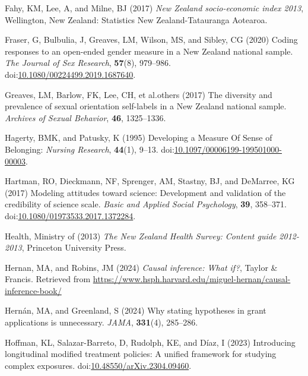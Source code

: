 \documentclass[
  single column]{article}
\newlength{\cslhangindent}
\newenvironment{CSLReferences}[2] %
 {\begin{list}{}{%
  \setlength{\itemindent}{0pt}
  \setlength{\leftmargin}{0pt}
  \setlength{\parsep}{0pt}
  \ifodd #1
   \setlength{\leftmargin}{\cslhangindent}
   \setlength{\itemindent}{-1\cslhangindent}
  \fi
  \setlength{\itemsep}{#2\baselineskip}}}
 {\end{list}}
\begin{document}
\begin{CSLReferences}{1}{0}
Fahy, KM, Lee, A, and Milne, BJ (2017) \emph{{N}ew {Z}ealand
socio-economic index 2013}, Wellington, New Zealand: Statistics New
Zealand-Tatauranga Aotearoa.

Fraser, G, Bulbulia, J, Greaves, LM, Wilson, MS, and Sibley, CG (2020)
Coding responses to an open-ended gender measure in a {N}ew {Z}ealand
national sample. \emph{The Journal of Sex Research}, \textbf{57}(8),
979--986.
doi:\href{https://doi.org/10.1080/00224499.2019.1687640}{10.1080/00224499.2019.1687640}.

Greaves, LM, Barlow, FK, Lee, CH, et al.others (2017) The diversity and
prevalence of sexual orientation self-labels in a {N}ew {Z}ealand
national sample. \emph{Archives of Sexual Behavior}, \textbf{46},
1325--1336.

Hagerty, BMK, and Patusky, K (1995) Developing a Measure Of Sense of
Belonging: \emph{Nursing Research}, \textbf{44}(1), 9--13.
doi:\href{https://doi.org/10.1097/00006199-199501000-00003}{10.1097/00006199-199501000-00003}.

Hartman, RO, Dieckmann, NF, Sprenger, AM, Stastny, BJ, and DeMarree, KG
(2017) Modeling attitudes toward science: Development and validation of
the credibility of science scale. \emph{Basic and Applied Social
Psychology}, \textbf{39}, 358--371.
doi:\href{https://doi.org/10.1080/01973533.2017.1372284}{10.1080/01973533.2017.1372284}.

Health, Ministry of (2013) \emph{The {N}ew {Z}ealand {H}ealth {S}urvey:
Content guide 2012-2013}, Princeton University Press.

Hernan, MA, and Robins, JM (2024) \emph{Causal inference: What if?},
Taylor \& Francis. Retrieved from
\url{https://www.hsph.harvard.edu/miguel-hernan/causal-inference-book/}

Hernán, MA, and Greenland, S (2024) Why stating hypotheses in grant
applications is unnecessary. \emph{JAMA}, \textbf{331}(4), 285--286.

Hoffman, KL, Salazar-Barreto, D, Rudolph, KE, and Díaz, I (2023)
Introducing longitudinal modified treatment policies: A unified
framework for studying complex exposures.
doi:\href{https://doi.org/10.48550/arXiv.2304.09460}{10.48550/arXiv.2304.09460}.


\end{CSLReferences}
\end{document}

